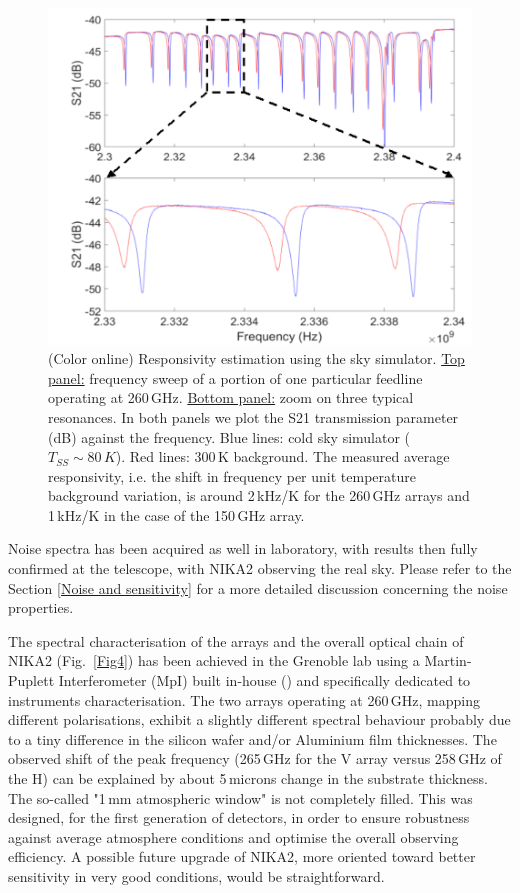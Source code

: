 \documentclass[]{aa} %
\begin{document}
\begin{figure}[h]
\begin{center}
   \centering
    \includegraphics[width=1.0\linewidth]{260GHz-H_sky.png}
    \caption{(Color online) Responsivity estimation using the sky simulator. \underline{Top panel:} frequency sweep of a portion of one particular feedline operating at 260\,GHz. \underline{Bottom panel:} zoom on three typical resonances. In both panels we plot the S21 transmission parameter (dB) against the frequency. Blue lines: cold sky simulator ($T_{SS} \sim 80\,K$). Red lines: 300\,K background. The measured average responsivity, i.e. the shift in frequency per unit temperature background variation, is around 2\,kHz/K for the 260\,GHz arrays and 1\,kHz/K in the case of the 150\,GHz array.}
         \label{Shift_f}
\end{center}
\end{figure}

Noise spectra has been acquired as well in laboratory, with results then fully confirmed at the telescope, with NIKA2 observing the real sky. Please refer to the Section \ref{Noise and sensitivity} for a more detailed discussion concerning the noise properties. 

The spectral characterisation of the arrays and the overall optical chain of NIKA2 (Fig.~\ref{Fig4}) has been achieved in the Grenoble lab using a Martin-Puplett Interferometer (MpI) built in-house (\cite{Durand2008}) and specifically dedicated to instruments characterisation. The two arrays operating at 260\,GHz, mapping different polarisations, exhibit a slightly different spectral behaviour probably due to a tiny difference in the silicon wafer and/or Aluminium film thicknesses. The observed shift of the peak frequency (265\,GHz for the V array versus 258\,GHz of the H) can be explained by about 5\,microns change in the substrate thickness. The so-called "1\,mm atmospheric window" is not completely filled. This was designed, for the first generation of detectors, in order to ensure robustness against average atmosphere conditions and optimise the overall observing efficiency. A possible future upgrade of NIKA2, more oriented toward better sensitivity in very good conditions, would be straightforward. 
\end{document}
